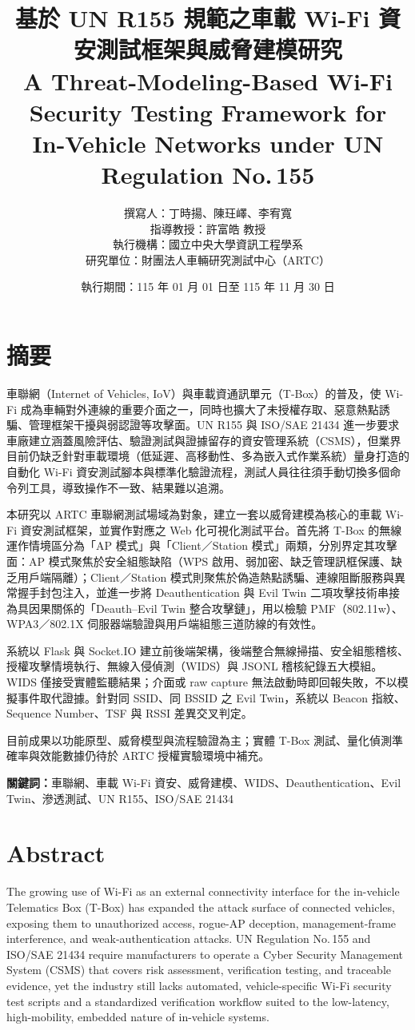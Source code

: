 \documentclass[12pt,a4paper,oneside]{report}
\title{基於 UN R155 規範之車載 Wi-Fi 資安測試框架與威脅建模研究\\[6pt]
\large A Threat-Modeling-Based Wi-Fi Security Testing Framework for\\
In-Vehicle Networks under UN Regulation No.\,155}
\author{撰寫人：丁時揚、陳玨嶧、李宥寬\\
指導教授：許富皓 教授\\
執行機構：國立中央大學資訊工程學系\\
研究單位：財團法人車輛研究測試中心（ARTC）}
\date{執行期間：115 年 01 月 01 日至 115 年 11 月 30 日}
\begin{document}
\maketitle
{}

\chapter*{摘要}
車聯網（Internet of Vehicles, IoV）與車載資通訊單元（T-Box）的普及，使 Wi-Fi 成為車輛對外連線的重要介面之一，同時也擴大了未授權存取、惡意熱點誘騙、管理框架干擾與弱認證等攻擊面。UN R155 與 ISO/SAE 21434 進一步要求車廠建立涵蓋風險評估、驗證測試與證據留存的資安管理系統（CSMS），但業界目前仍缺乏針對車載環境（低延遲、高移動性、多為嵌入式作業系統）量身打造的自動化 Wi-Fi 資安測試腳本與標準化驗證流程，測試人員往往須手動切換多個命令列工具，導致操作不一致、結果難以追溯。

本研究以 ARTC 車聯網測試場域為對象，建立一套以威脅建模為核心的車載 Wi-Fi 資安測試框架，並實作對應之 Web 化可視化測試平台。首先將 T-Box 的無線運作情境區分為「AP 模式」與「Client／Station 模式」兩類，分別界定其攻擊面：AP 模式聚焦於安全組態缺陷（WPS 啟用、弱加密、缺乏管理訊框保護、缺乏用戶端隔離）；Client／Station 模式則聚焦於偽造熱點誘騙、連線阻斷服務與異常握手封包注入，並進一步將 Deauthentication 與 Evil Twin 二項攻擊技術串接為具因果關係的「Deauth–Evil Twin 整合攻擊鏈」，用以檢驗 PMF（802.11w）、WPA3／802.1X 伺服器端驗證與用戶端組態三道防線的有效性。

系統以 Flask 與 Socket.IO 建立前後端架構，後端整合無線掃描、安全組態稽核、授權攻擊情境執行、無線入侵偵測（WIDS）與 JSONL 稽核紀錄五大模組。WIDS 僅接受實體監聽結果；介面或 raw capture 無法啟動時即回報失敗，不以模擬事件取代證據。針對同 SSID、同 BSSID 之 Evil Twin，系統以 Beacon 指紋、Sequence Number、TSF 與 RSSI 差異交叉判定。

目前成果以功能原型、威脅模型與流程驗證為主；實體 T-Box 測試、量化偵測準確率與效能數據仍待於 ARTC 授權實驗環境中補充。

\noindent\textbf{關鍵詞：}車聯網、車載 Wi-Fi 資安、威脅建模、WIDS、Deauthentication、Evil Twin、滲透測試、UN R155、ISO/SAE 21434

\chapter*{Abstract}
The growing use of Wi-Fi as an external connectivity interface for the in-vehicle Telematics Box (T-Box) has expanded the attack surface of connected vehicles, exposing them to unauthorized access, rogue-AP deception, management-frame interference, and weak-authentication attacks. UN Regulation No.\,155 and ISO/SAE 21434 require manufacturers to operate a Cyber Security Management System (CSMS) that covers risk assessment, verification testing, and traceable evidence, yet the industry still lacks automated, vehicle-specific Wi-Fi security test scripts and a standardized verification workflow suited to the low-latency, high-mobility, embedded nature of in-vehicle systems.
\end{document}
